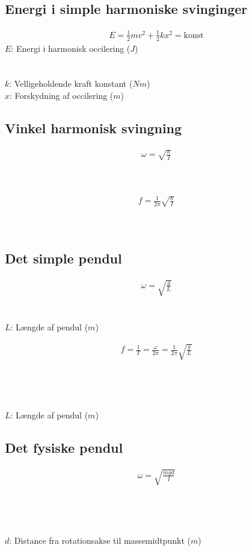\subsection{Energi i simple harmoniske svinginger}
	\begin{align}
		E=\frac{1}{2}mv^2+\frac{1}{2}kx^2=\text{konst}
	\end{align}
	$E$: Energi i harmonisk occilering ($J$)\\
	\masse\\
	\vel\\
	$k$: Velligeholdende kraft konstant ($Nm$)\\
	$x$: Forskydning af occilering ($m$)

\subsection{Vinkel harmonisk svingning}
	\begin{align}
		\omega=\sqrt{\frac{\kappa}{I}}
	\end{align}
	\vinkelhast\\
	\torsion\\
	\inertimom

	\begin{align}
		f=\frac{1}{2\pi}\sqrt{\frac{\kappa}{I}}
	\end{align}
	\frekvens\\
	\torsion\\
	\inertimom

\subsection{Det simple pendul}
	\begin{align}
		\omega=\sqrt{\frac{g}{L}}
	\end{align}
	\vinkel\\
	\tyngde\\
	$L$: Længde af pendul ($m$)

	\begin{align}
		f=\frac{1}{T}=\frac{\omega}{2\pi}=\frac{1}{2\pi}\sqrt{\frac{g}{L}}
	\end{align}
	\frekvens\\
	\periode\\
	\vinkelhast\\
	\tyngde\\
	$L$: Længde af pendul ($m$)
	
\subsection{Det fysiske pendul}
	\begin{align}
		\omega=\sqrt{\frac{mgd}{I}}
	\end{align}
	\vinkelhast\\
	\masse\\
	\tyngde\\
	\inertimom\\
	$d$: Distance fra rotationsakse til massemidtpunkt ($m$)

